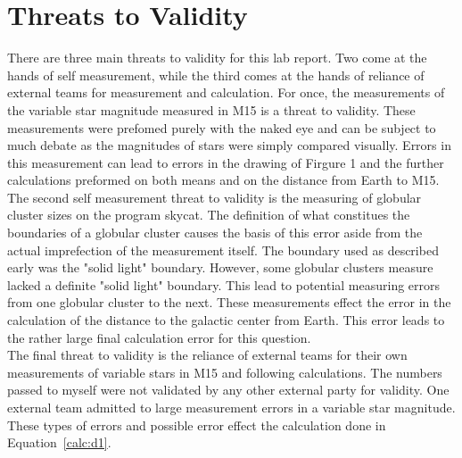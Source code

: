 \documentclass{article}
\begin{document}

\section{Threats to Validity}

There are three main threats to validity for this lab report. Two come at the hands
of self measurement, while the third comes at the hands of reliance of external
teams for measurement and calculation. For once, the measurements of the variable
star magnitude measured in M15 is a threat to validity. These measurements were prefomed
purely with the naked eye and can be subject to much debate as the magnitudes of
stars were simply compared visually. Errors in this measurement can lead to errors
in the drawing of Firgure 1 and the further calculations preformed on both means and
on the distance from Earth to M15. \\

The second self measurement threat to validity is the measuring of globular cluster
sizes on the program skycat. The definition of what constitues the boundaries of a
globular cluster causes the basis of this error aside from the actual imprefection
of the measurement itself. The boundary used as described early was the "solid light"
boundary. However, some globular clusters measure lacked a definite "solid light"
boundary. This lead to potential measuring errors from one globular cluster to the
next. These measurements effect the error in the calculation of the distance to
the galactic center from Earth. This error leads to the rather large final calculation
error for this question. \\

The final threat to validity is the reliance of external teams for their own measurements
of variable stars in M15 and following calculations. The numbers passed to myself
were not validated by any other external party for validity. One external team
admitted to large measurement errors in a variable star magnitude. These types of errors
and possible error effect the calculation done in Equation~\ref{calc:d1}.



\end{document}
